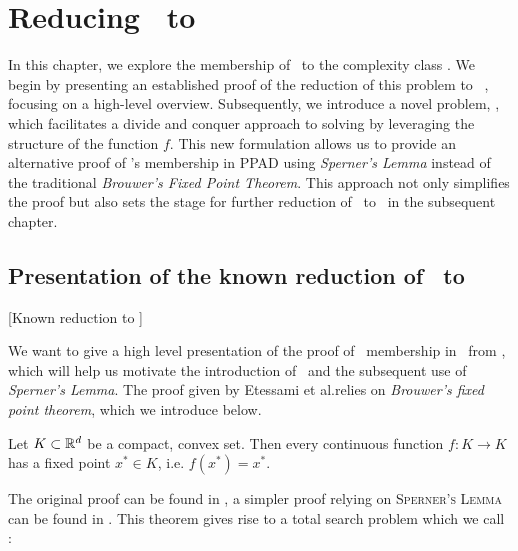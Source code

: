 \setchapterpreamble[u]{\margintoc}
\chapter{Reducing \Tarski\ to \PPAD}
\label{ch:ppad_reduction}

In this chapter, we explore the membership of \Tarski\ to the complexity class \PPAD. We begin by presenting an established proof of the reduction of this problem to \Brouwer~, focusing on a high-level overview. Subsequently, we introduce a novel problem, \Tarskistar, which facilitates a divide and conquer approach to solving \Tarski by leveraging the structure of the function $f$. This new formulation allows us to provide an alternative proof of \Tarski’s membership in PPAD using \textit{Sperner's Lemma} instead of the traditional \textit{Brouwer's Fixed Point Theorem}. This approach not only simplifies the proof but also sets the stage for further reduction of \Tarskistar\ to \EOPL\ in the subsequent chapter.

\section{Presentation of the known reduction of \Tarski\ to \PPAD}[Known reduction to \PPAD]

We want to give a high level presentation of the proof of \Tarski\ membership in \PPAD\ from , which will help us motivate the introduction of \Tarskistar\ and the subsequent use of \textit{Sperner's Lemma}. The proof given by Etessami et al.\@ relies on \textit{Brouwer's fixed point theorem}, which we introduce below.

\begin{theorem}
    Let $K \subset \mathbb{R}^d$ be a compact, convex set. Then every continuous function $f : K \rightarrow K$ has a fixed point $x^*	\in K$, i.e. $f(x^*) = x^*$.
\end{theorem}

The original proof can be found in , a simpler proof relying on \textsc{Sperner's Lemma} can be found in . This theorem gives rise to a total search problem which we call \Brouwer:


